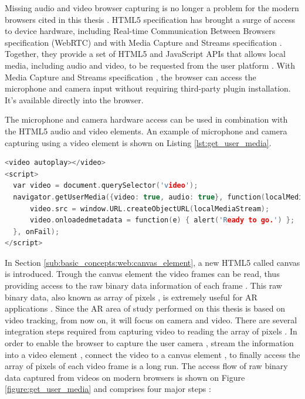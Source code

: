 Missing audio and video browser capturing is no longer a problem for the modern browsers cited in this thesis \cite{WebRTC2013,Hickson2013}. HTML5 specification \cite{Hickson2013} has brought a surge of access to device hardware, including Real-time Communication Between Browsers specification (WebRTC) \cite{WebRTC2013} and with Media Capture and Streams specification \cite{MediaCapture2013}. Together, they provide a set of HTML5 \cite{Hickson2013} and JavaScript \cite{International2009} APIs \cite{WebRTC2013} that allows local media, including audio and video, to be requested from the user platform \cite{WC2006}. With Media Capture and Streams specification \cite{MediaCapture2013}, the browser can access the microphone and camera input without requiring third-party plugin installation. It's available directly into the browser.

The microphone and camera hardware access can be used in combination with the HTML5 \cite{Hickson2013} audio and video elements. An example of microphone and camera capturing using a video element is shown on Listing \ref{lst:get_user_media}.

\begin{lstlisting}[language=C++,label={lst:get_user_media},caption=Capture and display microphone and camera]
<video autoplay></video>
<script>
  var video = document.querySelector('video');
  navigator.getUserMedia({video: true, audio: true}, function(localMediaStream) {
      video.src = window.URL.createObjectURL(localMediaStream);
      video.onloadedmetadata = function(e) { alert('Ready to go.') };
  }, onFail);
</script>
\end{lstlisting}

In Section \ref{sub:basic_concepts:web:canvas_element}, a new HTML5 \cite{Hickson2013} called canvas \cite{Canvas2013} is introduced. Trough the canvas element \cite{Canvas2013} the video frames can be read, thus providing access to the raw binary data information of each frame \cite{Canvas2013,Hickson2013}. This raw binary data, also known as array of pixels \cite{Gonzalez2007}, is extremely useful for AR applications \cite{Teichrieb2007}. Since the AR area of study performed on this thesis is based on video tracking, from now on, it will focus on camera and video. There are several integration steps required from capturing video to reading the array of pixels \cite{Gonzalez2007}. In order to enable the browser to capture the user camera \cite{MediaCapture2013}, stream the information into a video element \cite{Hickson2013}, connect the video to a canvas element \cite{Canvas2013}, to finally access the array of pixels of each video frame is a long run. The access flow of raw binary data captured from videos on modern browsers is shown on Figure \ref{figure:get_user_media} and comprises four major steps \cite{WebRTC2013,Rocks2013}:

